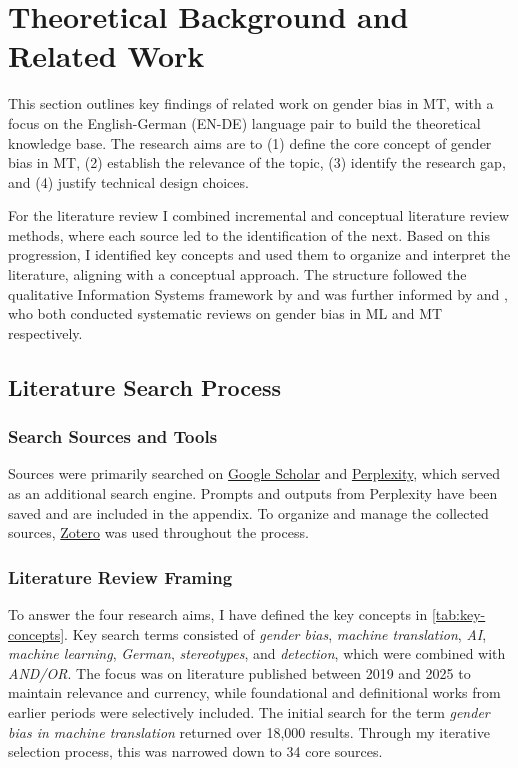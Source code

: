 \chapter{Theoretical Background and Related Work}
This section outlines key findings of related work on gender bias in MT, with a focus on the English-German (EN-DE) language pair to build the theoretical knowledge base. The research aims are to (1) define the core concept of gender bias in MT, (2) establish the relevance of the topic, (3) identify the research gap, and (4) justify technical design choices. 

For the literature review I combined incremental and conceptual literature review methods, where each source led to the identification of the next. Based on this progression, I identified key concepts and used them to organize and interpret the literature, aligning with a conceptual approach. The structure followed the qualitative Information Systems framework by \citet{schryenWritingQualitativeLiterature2015} and was further informed by \citet{shresthaExploringGenderBiases2022} and \citet{savoldiDecadeGenderBias2025}, who both conducted systematic reviews on gender bias in ML and MT respectively. 

\section{Literature Search Process}

\subsection{Search Sources and Tools}
Sources were primarily searched on \href{https://scholar.google.com/}{Google Scholar} and \href{https://www.perplexity.ai/}{Perplexity}, which served as an additional search engine. Prompts and outputs from Perplexity have been saved and are included in the appendix. To organize and manage the collected sources, \href{https://www.zotero.org/}{Zotero} was used throughout the process.

\subsection{Literature Review Framing}

To answer the four research aims, I have defined the key concepts in \autoref{tab:key-concepts}. Key search terms consisted of \textit{gender bias}, \textit{machine translation}, \textit{AI}, \textit{machine learning}, \textit{German}, \textit{stereotypes}, and \textit{detection}, which were combined with \textit{AND/OR}. The focus was on literature published between 2019 and 2025 to maintain relevance and currency, while foundational and definitional works from earlier periods were selectively included. The initial search for the term \textit{gender bias in machine translation} returned over 18,000 results. Through my iterative selection process, this was narrowed down to 34 core sources.

